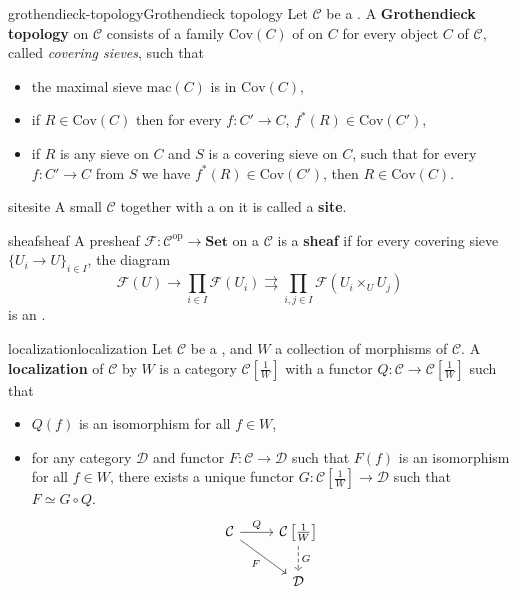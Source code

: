 \begin{topic}{grothendieck-topology}{Grothendieck topology}
    Let $\mathcal{C}$ be a . A \textbf{Grothendieck topology} on $\mathcal{C}$ consists of a family $\text{Cov}(C)$ of  on $C$ for every object $C$ of $\mathcal{C}$, called \textit{covering sieves}, such that
    \begin{itemize}
        \item the maximal sieve $\text{mac}(C)$ is in $\text{Cov}(C)$,
        \item if $R \in \text{Cov}(C)$ then for every $f : C' \to C$, $f^*(R) \in \text{Cov}(C')$,
        \item if $R$ is any sieve on $C$ and $S$ is a covering sieve on $C$, such that for every $f : C' \to C$ from $S$ we have $f^*(R) \in \text{Cov}(C')$, then $R \in \text{Cov}(C)$.
    \end{itemize}
\end{topic}

\begin{topic}{site}{site}
    A small  $\mathcal{C}$ together with a  on it is called a \textbf{site}.
\end{topic}

\begin{topic}{sheaf}{sheaf}
    A presheaf $\mathcal{F} : \mathcal{C}^\text{op} \to \textbf{Set}$ on a  $\mathcal{C}$ is a \textbf{sheaf} if for every covering sieve $\{ U_i \to U \}_{i \in I}$, the diagram
    \[ \mathcal{F}(U) \to \prod_{i \in I} \mathcal{F}(U_i) \rightrightarrows \prod_{i, j \in I} \mathcal{F}(U_i \times_U U_j) \]
    is an .
\end{topic}

\begin{topic}{localization}{localization}
    Let $\mathcal{C}$ be a , and $W$ a collection of morphisms of $\mathcal{C}$. A \textbf{localization} of $\mathcal{C}$ by $W$ is a category $\mathcal{C}\left[\frac{1}{W}\right]$ with a functor $Q : \mathcal{C} \to \mathcal{C}\left[\frac{1}{W}\right]$ such that
    \begin{itemize}
        \item $Q(f)$ is an isomorphism for all $f \in W$,
        \item for any category $\mathcal{D}$ and functor $F : \mathcal{C} \to \mathcal{D}$ such that $F(f)$ is an isomorphism for all $f \in W$, there exists a unique functor $G : \mathcal{C}\left[\frac{1}{W}\right] \to \mathcal{D}$ such that $F \simeq G \circ Q$.
        \[ \begin{tikzcd} \mathcal{C} \arrow{r}{Q} \arrow[swap]{rd}{F} & \mathcal{C}\left[\frac{1}{W}\right] \arrow[dashed]{d}{G} \\ & \mathcal{D} \end{tikzcd} \]
    \end{itemize}
\end{topic}

